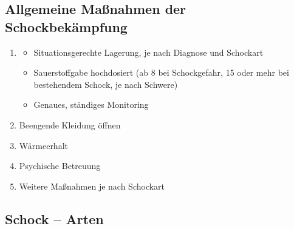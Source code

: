 \subsection{Allgemeine Maßnahmen der Schockbekämpfung}
\label{topic:schockbekaempfung}


{\label{m:am-schock}}
{
\begin{enumerate}
  \item \TxMassVitBes
  \begin{itemize}
    \item Situationsgerechte  Lagerung, je nach Diagnose und Schockart
    \item Sauerstoffgabe hochdosiert (ab 8\LMin{} bei Schockgefahr,
    15\LMin{} oder mehr bei bestehendem Schock, je nach Schwere)
    \item Genaues, ständiges Monitoring
  \end{itemize}
  \item Beengende Kleidung öffnen
  \item Wärmeerhalt
  \item Psychische Betreuung
  \item Weitere Maßnahmen je nach Schockart
\end{enumerate}
}



\subsection{Schock -- Arten}

